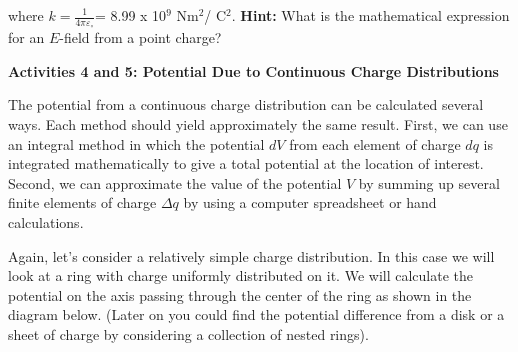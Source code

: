 where \( k=\frac{1}{4\pi \varepsilon _{\circ }} \)= 8.99 x 10\( ^{9} \)
Nm\( ^{2} \)/ C\( ^{2} \).
\textbf{Hint:} What is the mathematical expression for an $E$-field
from a point charge?

{ \par}

\answerspace{15mm}

\textbf{Activities 4 and 5: Potential Due to Continuous Charge Distributions}

The potential from a continuous charge distribution can be calculated
several ways. Each method should yield approximately the same result.
First, we can use an integral method in which the potential $dV$ from
each element of charge $dq$ is integrated mathematically to give a total
potential at the location of interest. Second, we can approximate
the value of the potential $V$ by summing up several finite elements
of charge \( \Delta q \) by using a computer spreadsheet or hand
calculations.

Again, let's consider a relatively simple charge distribution. In
this case we will look at a ring with charge uniformly distributed
on it. We will calculate the potential on the axis passing through
the center of the ring as shown in the diagram below. (Later on you
could find the potential difference from a disk or a sheet of charge
by considering a collection of nested rings).

